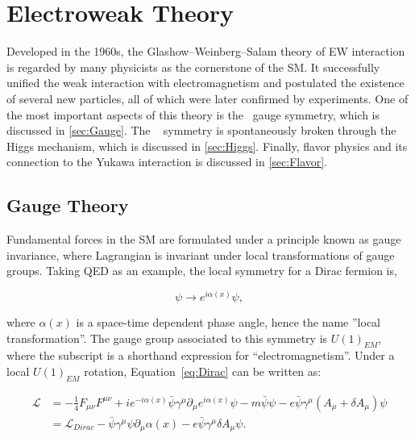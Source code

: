 \chapter{Electroweak Theory}
\label{chap:SM}

Developed in the 1960s, the Glashow–Weinberg–Salam theory of \ac{EW} interaction is regarded by many physicists as the cornerstone of the \ac{SM}. It successfully unified the weak interaction with electromagnetism and postulated the existence of several new particles, all of which were later confirmed by experiments. One of the most important aspects of this theory is the \ew~gauge symmetry, which is discussed in \autoref{sec:Gauge}. The \ew~ symmetry is spontaneously broken through the Higgs mechanism, which is discussed in \autoref{sec:Higgs}. Finally, flavor physics and its connection to the Yukawa interaction is discussed in \autoref{sec:Flavor}. 

\section{Gauge Theory}
\label{sec:Gauge}

Fundamental forces in the \ac{SM} are formulated under a principle known as gauge invariance, where Lagrangian is invariant under local transformations of gauge groups. Taking \ac{QED} as an example, the local symmetry for a Dirac fermion is,

\begin{equation}
\psi\rightarrow e^{i\alpha(x)}\psi,
\end{equation}

where $\alpha(x)$ is a space-time dependent phase angle, hence the name ''local transformation''. The gauge group associated to this symmetry is $U(1)_{EM}$, where the subscript is a shorthand expression for ``electromagnetism''. Under a local $U(1)_{EM}$ rotation, Equation~\ref{eq:Dirac} can be written as:

\begin{equation}
\begin{split}
\label{eq:QEDGauge}
\mathcal{L}&=-\frac{1}{4}F_{\mu\nu}F^{\mu\nu}+ie^{-i\alpha(x)}\bar{\psi}\gamma^{\mu}\partial_{\mu}e^{i\alpha(x)}\psi-m\bar{\psi}\psi-e\bar{\psi}\gamma^{\mu}(A_{\mu}+\delta A_{\mu})\psi\\
&=\mathcal{L}_{Dirac}-\bar{\psi}\gamma^{\mu}\psi\partial_{\mu}\alpha(x)-e\bar{\psi}\gamma^{\mu}\delta A_{\mu}\psi.
\end{split}
\end{equation}

